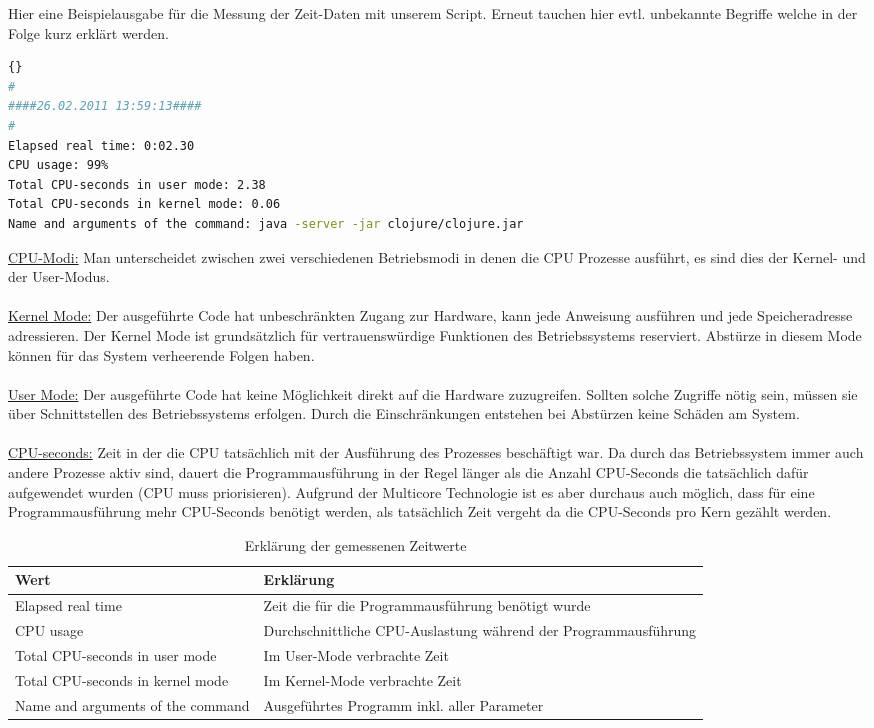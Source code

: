 \documentclass{fancydocument}
\begin{document}
Hier eine Beispielausgabe für die Messung der Zeit-Daten mit unserem Script. Erneut tauchen hier evtl. unbekannte Begriffe welche in der Folge kurz erklärt werden.

\begin{minipage}{\textwidth}
\begin{lstlisting}[language=bash,caption=Speicherdaten]{}
#
####26.02.2011 13:59:13####
#
Elapsed real time: 0:02.30
CPU usage: 99%
Total CPU-seconds in user mode: 2.38
Total CPU-seconds in kernel mode: 0.06
Name and arguments of the command: java -server -jar clojure/clojure.jar
\end{lstlisting}
\end{minipage}

\bigskip
\noindent
\underline{CPU-Modi:} Man unterscheidet zwischen zwei verschiedenen Betriebsmodi in denen die CPU Prozesse ausführt, es sind dies der Kernel- und der User-Modus.
\\\\
\underline{Kernel Mode:} Der ausgeführte Code hat unbeschränkten Zugang zur Hardware, kann jede Anweisung ausführen und jede Speicheradresse adressieren. Der Kernel Mode ist grundsätzlich für vertrauenswürdige Funktionen des Betriebssystems reserviert. Abstürze in diesem Mode können für das System verheerende Folgen haben.
\\\\
\underline{User Mode:} Der ausgeführte Code hat keine Möglichkeit direkt auf die Hardware zuzugreifen. Sollten solche Zugriffe nötig sein, müssen sie über Schnittstellen des Betriebssystems erfolgen. Durch die Einschränkungen entstehen bei Abstürzen keine Schäden am System.
\\\\
\underline{CPU-seconds:} Zeit in der die CPU tatsächlich mit der Ausführung des Prozesses beschäftigt war. Da durch das Betriebssystem immer auch andere Prozesse aktiv sind, dauert die Programmausführung in der Regel länger als die Anzahl CPU-Seconds die tatsächlich dafür aufgewendet wurden (CPU muss priorisieren). Aufgrund der Multicore Technologie ist es aber durchaus auch möglich, dass für eine Programmausführung mehr CPU-Seconds benötigt werden, als tatsächlich Zeit vergeht da die CPU-Seconds pro Kern gezählt werden.
\\
\begin{table}[h!]
\begin{tabular}[c]{|p{4cm}|p{11cm}|} \hline
\textbf{Wert} & \textbf{Erklärung}\\
\hline
Elapsed real time & Zeit die für die Programmausführung benötigt wurde\\
\hline
CPU usage & Durchschnittliche CPU-Auslastung während der Programmausführung\\
\hline
Total CPU-seconds in user mode & Im User-Mode verbrachte Zeit\\
\hline
Total CPU-seconds in kernel mode & Im Kernel-Mode verbrachte Zeit\\
\hline
Name and arguments of the command & Ausgeführtes Programm inkl. aller Parameter\\
\hline
\end{tabular}
\caption{Erklärung der gemessenen Zeitwerte}
\end{table}
\end{document}

